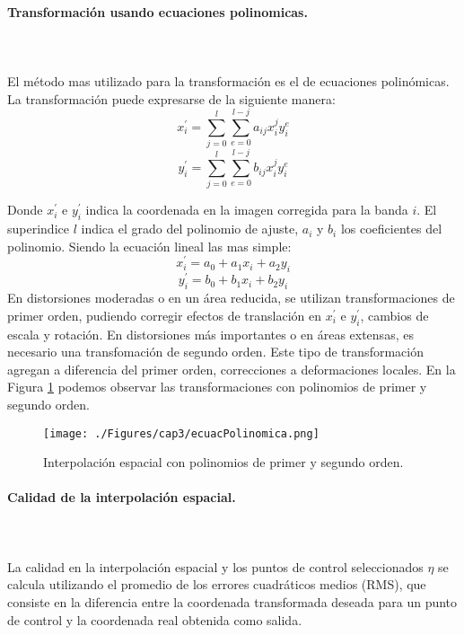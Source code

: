 \paragraph{Transformación usando ecuaciones polinomicas. }\mbox{}\\\mbox{}\\
El m\'etodo mas utilizado para la transformaci\'on es el de ecuaciones polin\'omicas.	 La transformaci\'on puede expresarse de la siguiente manera:
	\begin{equation}
	x^{'}_{i} = \sum_{j=0}^{l} \sum_{e=0}^{l-j} a_{ij}x^{j}_{i}y^{e}_{i}
	\end{equation} 
		\begin{equation}
		y^{'}_{i} = \sum_{j=0}^{l} \sum_{e=0}^{l-j} b_{ij}x^{j}_{i}y^{e}_{i}
		\end{equation} 




Donde $ x^{'}_{i} $ e $ y^{'}_{i} $ indica la coordenada en la imagen corregida para la banda $ i $. El superindice $ l $ indica el grado del polinomio de ajuste, $ a_{i} $ y $ b_{i} $ los coeficientes del polinomio. Siendo la ecuaci\'on lineal las mas simple:
	\begin{equation}
	x^{'}_{i} = a_{0}+a_{1}x_{i}+a_{2}y_{i}
	\end{equation} 
		\begin{equation}
		y^{'}_{i} = b_{0}+b_{1}x_{i}+b_{2}y_{i}
		\end{equation} 
En distorsiones moderadas o en un \'area reducida, se utilizan transformaciones de primer orden, pudiendo corregir efectos de translaci\'on en $ x^{'}_{i} $ e $ y^{'}_{i} $, cambios de escala y rotaci\'on.
En distorsiones m\'as importantes o en \'areas extensas, es necesario una transfomaci\'on de segundo orden. Este tipo de transformaci\'on agregan a diferencia del primer orden, correcciones a deformaciones locales.
En la Figura \ref{fig:intPolEcua} podemos observar las transformaciones con polinomios de primer y segundo orden.
    \begin{figure}[H]
    	\centering
    	\texttt{[image: ./Figures/cap3/ecuacPolinomica.png]}
    	\caption{Interpolaci\'on espacial con polinomios de primer y segundo orden.}
    	\label{fig:intPolEcua}
    \end{figure}
    
  \paragraph{Calidad de la interpolaci\'on espacial. }\mbox{}\\\mbox{}\\
 La calidad en la interpolaci\'on espacial y los puntos de control seleccionados $ \eta $ se calcula utilizando el promedio de los errores cuadráticos medios (RMS), que consiste en la diferencia entre la coordenada transformada deseada para un punto de control y la coordenada real obtenida como salida.

